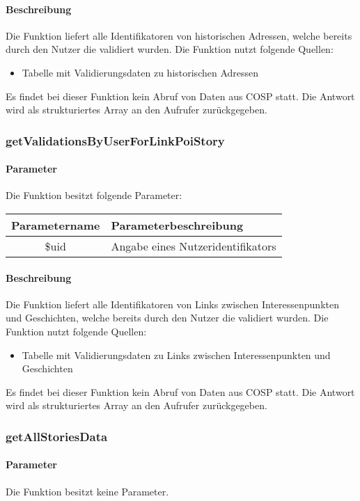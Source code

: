 \paragraph{Beschreibung} Die Funktion liefert alle Identifikatoren von historischen Adressen, welche bereits durch den Nutzer die validiert wurden. Die Funktion nutzt folgende Quellen:
\begin{itemize}
	\item Tabelle mit Validierungsdaten zu historischen Adressen
\end{itemize}
Es findet bei dieser Funktion kein Abruf von Daten aus {\glqq COSP\grqq} statt. Die Antwort wird als strukturiertes Array an den Aufrufer zurückgegeben.
\subsubsection{getValidationsByUserForLinkPoiStory}
\paragraph{Parameter} Die Funktion besitzt folgende Parameter:
\begin{table}[H]
	\begin{tabular}{|c|p{11cm}|}
		\hline
		\textbf{Parametername} & \textbf{Parameterbeschreibung} \\ \hline
		\$uid & Angabe eines Nutzeridentifikators \\ \hline
	\end{tabular}
\end{table}
\paragraph{Beschreibung} Die Funktion liefert alle Identifikatoren von Links zwischen Interessenpunkten und Geschichten, welche bereits durch den Nutzer die validiert wurden. Die Funktion nutzt folgende Quellen:
\begin{itemize}
	\item Tabelle mit Validierungsdaten zu Links zwischen Interessenpunkten und Geschichten
\end{itemize}
Es findet bei dieser Funktion kein Abruf von Daten aus {\glqq COSP\grqq} statt. Die Antwort wird als strukturiertes Array an den Aufrufer zurückgegeben.
\subsubsection{getAllStoriesData}
\paragraph{Parameter} Die Funktion besitzt keine Parameter.

